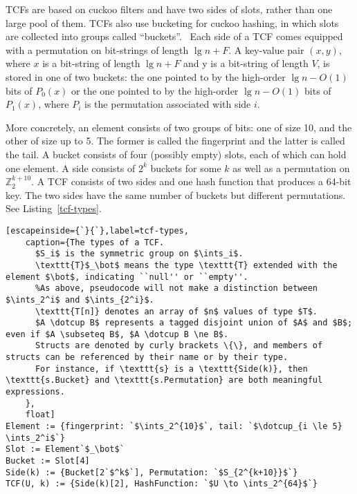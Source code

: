 \documentclass[sigconf, nonacm]{acmart}
\newcommand{\ints}{\mathbb{Z}}
\newcommand{\dotcup}{\ensuremath{\mathaccent\cdot\cup}}
\begin{document}

TCFs are based on cuckoo filters and have two sides of slots, rather than one large pool of them.
TCFs also use bucketing for cuckoo hashing, in which slots are collected into groups called ``buckets''.~\cite{buckets}
Each side of a TCF comes equipped with a permutation on bit-strings of length $\lg n + F$.
A key-value pair $(x, y)$, where $x$ is a bit-string of length $\lg n + F$ and y is a bit-string of length $V$, is stored in one of two buckets: the one pointed to by the high-order $\lg n - O(1)$ bits of $P_0(x)$ or the one pointed to by the high-order $\lg n - O(1)$ bits of $P_1(x)$, where $P_i$ is the permutation associated with side $i$.

More concretely, an element consists of two groups of bits: one of size 10, and the other of size up to 5.
The former is called the fingerprint and the latter is called the tail.
A bucket consists of four (possibly empty) slots, each of which can hold one element.
A side consists of $2^k$ buckets for some $k$ as well as a permutation on $\ints_2^{k+10}$. %
A TCF consists of two sides and one hash function that produces a 64-bit key.
The two sides have the same number of buckets but different permutations.
See Listing~\ref{tcf-types}.

\begin{lstlisting}[escapeinside={`}{`},label=tcf-types,
    caption={The types of a TCF.
      $S_i$ is the symmetric group on $\ints_i$.
      \texttt{T}$_\bot$ means the type \texttt{T} extended with the element $\bot$, indicating ``null'' or ``empty''.
      %As above, pseudocode will not make a distinction between $\ints_2^i$ and $\ints_{2^i}$.
      \texttt{T[n]} denotes an array of $n$ values of type $T$.
      $A \dotcup B$ represents a tagged disjoint union of $A$ and $B$; even if $A \subseteq B$, $A \dotcup B \ne B$.
      Structs are denoted by curly brackets \{\}, and members of structs can be referenced by their name or by their type.
      For instance, if \texttt{s} is a \texttt{Side(k)}, then \texttt{s.Bucket} and \texttt{s.Permutation} are both meaningful expressions.
    },
    float]
Element := {fingerprint: `$\ints_2^{10}$`, tail: `$\dotcup_{i \le 5} \ints_2^i$`}
Slot := Element`$_\bot$`
Bucket := Slot[4]
Side(k) := {Bucket[2`$^k$`], Permutation: `$S_{2^{k+10}}$`}
TCF(U, k) := {Side(k)[2], HashFunction: `$U \to \ints_2^{64}$`}
\end{lstlisting}
\end{document}
